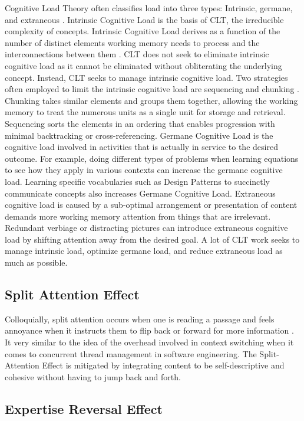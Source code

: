Cognitive Load Theory often classifies load into three types: Intrinsic, germane, and extraneous \cite{Sweller1991}. Intrinsic Cognitive Load is the basis of CLT, the irreducible complexity of concepts. Intrinsic Cognitive Load derives as a function of the number of distinct elements working memory needs to process and the interconnections between them \cite{Baddeley2003}. CLT does not seek to eliminate intrinsic cognitive load as it cannot be eliminated without obliterating the underlying concept. Instead, CLT seeks to manage intrinsic cognitive load. Two strategies often employed to limit the intrinsic cognitive load are sequencing and chunking \cite{Sweller1988}. Chunking takes similar elements and groups them together, allowing the working memory to treat the numerous units as a single unit for storage and retrieval. Sequencing sorts the elements in an ordering that enables progression with minimal backtracking or cross-referencing. Germane Cognitive Load is the cognitive load involved in activities that is actually in service to the desired outcome. For example, doing different types of problems when learning equations to see how they apply in various contexts can increase the germane cognitive load. Learning specific vocabularies such as Design Patterns to succinctly communicate concepts also increases Germane Cognitive Load.  Extraneous cognitive load is caused by a sub-optimal arrangement or presentation of content demands more working memory attention from things that are irrelevant. Redundant verbiage or distracting pictures can introduce extraneous cognitive load by shifting attention away from the desired goal. A lot of CLT work seeks to manage intrinsic load, optimize germane load, and reduce extraneous load as much as possible.    

\subsection{Split Attention Effect}

Colloquially, split attention occurs when one is reading a passage and feels annoyance when it instructs them to flip back or forward for more information \cite{Chandler1992}. It very similar to the idea of the overhead involved in context switching when it comes to concurrent thread management in software engineering. The Split-Attention Effect is mitigated by integrating content to be self-descriptive and cohesive without having to jump back and forth.

\subsection{Expertise Reversal Effect}

